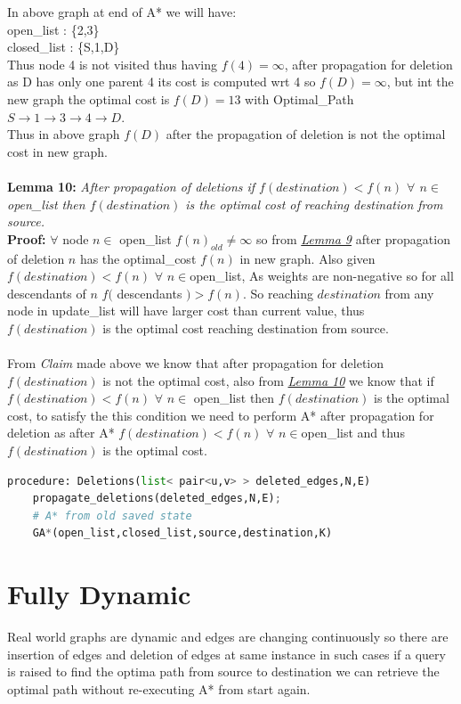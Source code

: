 \documentclass[a4paper]{article}
\begin{document}
In above graph at end of A* we will have:\\
open\_list : \{2,3\}\\
closed\_list : \{S,1,D\}\\
Thus node 4 is not visited thus having $f(4)=\infty$, after propagation for deletion as D has only one parent 4 its cost is computed wrt 4 so $f(D)=\infty$, but int the new graph the optimal cost is $f(D)=13$ with Optimal\_Path $S\rightarrow 1\rightarrow 3 \rightarrow 4 \rightarrow D$.\\
Thus in above graph $f(D)$ after the propagation of deletion is not the optimal cost in new graph.\\
\\
\hypertarget{Lemma 10}{\textbf{Lemma 10:} }\textit{After propagation of deletions if $f(destination) < f(n)$ $ \forall$ $n \in $open\_list then $f(destination)$ is the optimal cost of reaching destination from source.}\\
\textbf{Proof:} $\forall$ node $n \in $ open\_list $f(n)_{old} \neq \infty$ so from \hyperlink{Lemma 9}{\textit{Lemma 9}} after propagation of deletion $n$ has the optimal\_cost $f(n)$ in new graph. Also given $f(destination) < f(n)$ $ \forall$ $n \in $open\_list, As weights are non-negative so for all descendants of $n$ $f($ descendants $) > f(n)$. So reaching $destination$ from any node in update\_list will have larger cost than current value, thus $f(destination)$ is the optimal cost reaching destination from source.\\
\\
From \textit{Claim} made above we know that after propagation for deletion $f(destination)$ is not the optimal cost, also from \hyperlink{Lemma 10}{\textit{Lemma 10}} we know that if $f(destination) < f(n)$ $ \forall$ $n \in $ open\_list then $f(destination)$ is the optimal cost, to satisfy the this condition we need to perform A* after propagation for deletion as after A* $f(destination) < f(n)$ $ \forall$ $n \in $open\_list and thus $f(destination)$ is the optimal cost.
\begin{lstlisting}[language=python, caption=Manage Deletions]
procedure: Deletions(list< pair<u,v> > deleted_edges,N,E)
    propagate_deletions(deleted_edges,N,E);
    # A* from old saved state
    GA*(open_list,closed_list,source,destination,K)

\end{lstlisting}
\section{Fully Dynamic}
Real world graphs are dynamic and edges are changing continuously so there are insertion of edges and deletion of edges at same instance in such cases if a query is raised to find the optima path from source to destination we can retrieve the optimal path without re-executing A* from start again.
\end{document}
